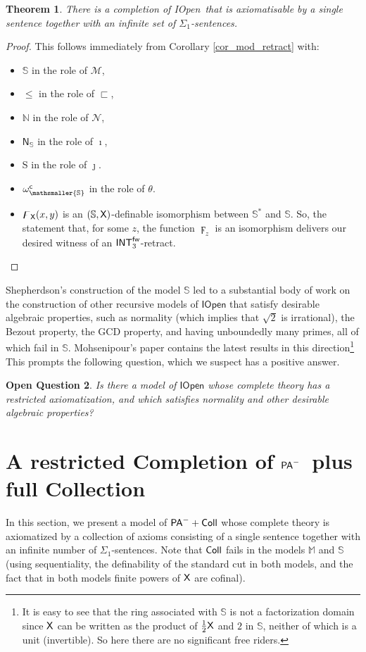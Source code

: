 \documentclass{amsart}
\newcommand{\qee} {\hspace*{2mm}\hfill \ding{109}}
\renewcommand{\leq}{\leqslant}
\newtheorem{theorem}{Theorem}[section]
\newtheorem{ques}[theorem]{Open Question}
\newenvironment{question}{\begin{ques} \rm}{\qee\end{ques}}
\newcommand{\mc}[1]{\mathcal #1}
\newcommand{\pam}{\ensuremath{{\sf PA}^{-}}}
\newcommand{\belowz}{\sqsubset}
\newcommand{\X}{{\sf X}}
\newcommand{\iopen}{{\sf IOpen}}
\newcommand{\mbbs}[1]{\ensuremath{\mathsmaller{\mathbb{#1}}}}
\begin{document}
\begin{theorem}\label{eigenwijzesmurf}
    There is a completion of \iopen\ that is axiomatisable by a single sentence together with an infinite set of $\Sigma_1$-sentences.
\end{theorem}
\begin{proof}

This follows immediately from Corollary \ref{cor_mod_retract}  with:
\begin{itemize}
    \item 
$\mathbb S$ in the role of $\mc M$, 
\item 
$\leq$ in the role of $\belowz$, 
\item 
$\mathbb N$ in the role of
$\mc N$, 
\item 
$\mathsf{N}_{\mathbb{S}}$ in the role of $\imath$,
\item 
{\sf S} in the role of $\jmath$. 
\item
$\omega_{\mbbs S}^{\sf c}$ in the role of $\theta$.
\item 
$\digamma_{\X}(x,y)$ is an $(\mathbb{S}, \X)$-definable isomorphism between
$\mathbb S^\ast$ and $\mathbb S$.
So, the statement that, for some $z$, the function $\digamma_z$ is an isomorphism
 delivers our desired witness of an ${\sf INT}^{\sf fw}_3$-retract.
\end{itemize}
\end{proof}
Shepherdson's construction of the model $\mathbb{S}$ led to a substantial body of work on the construction of other recursive models of $\mathsf{IOpen}$ that satisfy desirable algebraic properties, such as normality (which implies that $\sqrt{2}$ is irrational), the Bezout property, the GCD property, and having unboundedly many primes, all of which fail in $\mathbb{S}$. Mohsenipour's paper \cite{MohseniIOpen} contains the latest results in this direction\footnote{It is easy to see that the ring associated with $\mathbb{S}$ is not a factorization domain since $\X$ can be written as the product of $\frac{1}{2}\X$ and $2$ in $\mathbb{S}$, neither of which is a unit (invertible). So here there are no significant free riders. } This prompts the following question, which we suspect has a positive answer.
\begin{question} \label{IOpen_question} 
Is there a model of $\mathsf{IOpen}$ whose complete theory has a restricted axiomatization, and which satisfies normality and other desirable algebraic properties?
\end{question}

\section{A restricted Completion of \pam\ plus full Collection}\label{smurferella}
In this section, we present a model of $\pam+ {\sf Coll}$ whose complete theory is axiomatized by a collection of axioms consisting of a single sentence together with an infinite number of $\Sigma_1$-sentences. Note that ${\sf Coll}$ fails in the models $\mathbb{M}$ and $\mathbb{S}$ (using sequentiality, the definability of the standard cut in both models, and the fact that in both models finite powers of $\X$ are cofinal).
\end{document}
